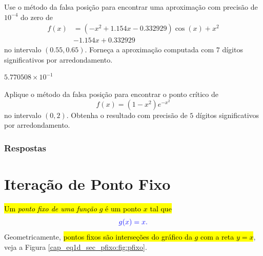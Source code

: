 \begin{exer}
  Use o método da falsa posição para encontrar uma aproximação com precisão de $10^{-4}$ do zero de
  \begin{equation}
    \begin{aligned}
      f(x) &= (-x^2+1.154x-0.332929)\cos(x) + x^2 \\
           &- 1.154x + 0.332929
    \end{aligned}
\end{equation}
no intervalo $(0.55, 0.65)$. Forneça a aproximação computada com $7$ dígitos significativos por arredondamento.
\end{exer}
\begin{resp}
  $5.770508\times 10^{-1}$
\end{resp}

\begin{exer}
  Aplique o método da falsa posição para encontrar o ponto crítico de
  \begin{equation}
    f(x) = (1-x^2)e^{-x^2}
  \end{equation}
  no intervalo $(0, 2)$. Obtenha o resultado com precisão de $5$ dígitos significativos por arredondamento.
\end{exer}

\ifisbook
\subsubsection{Respostas}
\shipoutAnswer
\fi


\section{Iteração de Ponto Fixo}\label{cap_eq1d_sec_pfixo}

\hl{Um \emph{ponto fixo de uma função} $g$ é um ponto $x$ tal que}
\begin{equation}\color{blue}g(x) = x.
\end{equation}
Geometricamente, \hl{pontos fixos são interseções do gráfico da $g$ com a reta $y=x$}, veja a Figura \ref{cap_eq1d_sec_pfixo:fig:pfixo}.

